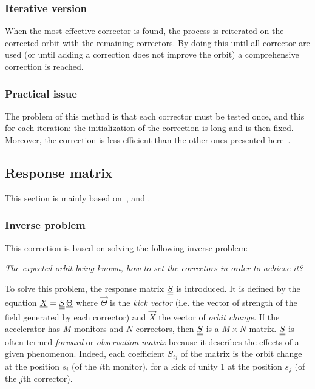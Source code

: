 \subsubsection{Iterative version}
When the most effective corrector is found, the process is reiterated on the corrected orbit with the remaining correctors. By doing this until all corrector are used (or until adding a correction does not improve the orbit) a comprehensive correction is reached.

\subsubsection{Practical issue}
The problem of this method is that each corrector must be tested once, and this for each iteration: the initialization of the correction is long and is then fixed. Moreover, the correction is less efficient than the other ones presented here~\cite{book:wille}.

\subsection{Response matrix}
\label{sec:response_matrix}
This section is mainly based on~\cite{book:wille}, \cite{art:decker-1991} and \cite{art:plouviez-1999}.

\subsubsection{Inverse problem}
This correction is based on solving the following inverse problem:
\begin{center}
\textit{The expected orbit being known, how to set the correctors in order to achieve it?}
\end{center}

To solve this problem, the response matrix $\underline{\underline{S}}$ is introduced. It is defined by the equation $\underline{X} = \underline{\underline{S}}\, \underline{\Theta}$ where $\vec{\Theta}$ is the \emph{kick vector} (i.e. the vector of strength of the field generated by each corrector) and $\vec{X}$ the vector of \emph{orbit change}. If the accelerator has $M$ monitors and $N$ correctors, then $\underline{\underline{S}}$ is a $M \times N$ matrix. $\underline{\underline{S}}$ is often termed \emph{forward} or \emph{observation matrix} because it describes the effects of a given phenomenon. Indeed, each coefficient $S_{ij}$ of the matrix is the orbit change at the position $s_i$ (of the $i$th monitor), for a kick of unity 1 at the position $s_j$ (of the $j$th corrector).

